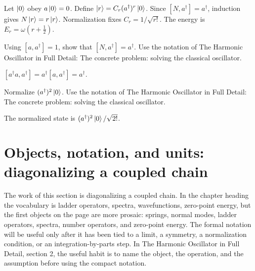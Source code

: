 \begin{example}
Let \(\left|0\right\rangle\) obey \(a\left|0\right\rangle=0\).  Define \(\left|r\right\rangle=C_r(a^\dagger)^r\left|0\right\rangle\).  Since \([N,a^\dagger]=a^\dagger\), induction gives \(N\left|r\right\rangle=r\left|r\right\rangle\).  Normalization fixes \(C_r=1/\sqrt{r!}\).  The energy is \(E_r=\omega(r+\frac12)\).
\end{example}



\begin{exercise}
Using \([a,a^\dagger]=1\), show that \([N,a^\dagger]=a^\dagger\).  Use the notation of The Harmonic Oscillator in Full Detail: The concrete problem: solving the classical oscillator.
\begin{answer}
\([a^\dagger a,a^\dagger]=a^\dagger[a,a^\dagger]=a^\dagger\).
\end{answer}
\end{exercise}

\begin{exercise}
Normalize \((a^\dagger)^2\left|0\right\rangle\).  Use the notation of The Harmonic Oscillator in Full Detail: The concrete problem: solving the classical oscillator.
\begin{answer}
The normalized state is \((a^\dagger)^2\left|0\right\rangle/\sqrt{2!}\).
\end{answer}
\end{exercise}



\section{Objects, notation, and units: diagonalizing a coupled chain}













The work of this section is diagonalizing a coupled chain.  In the chapter heading the vocabulary is ladder operators, spectra, wavefunctions, zero-point energy, but the first objects on the page are more prosaic: springs, normal modes, ladder operators, spectra, number operators, and zero-point energy.  The formal notation will be useful only after it has been tied to a limit, a symmetry, a normalization condition, or an integration-by-parts step.  In The Harmonic Oscillator in Full Detail, section 2, the useful habit is to name the object, the operation, and the assumption before using the compact notation.

